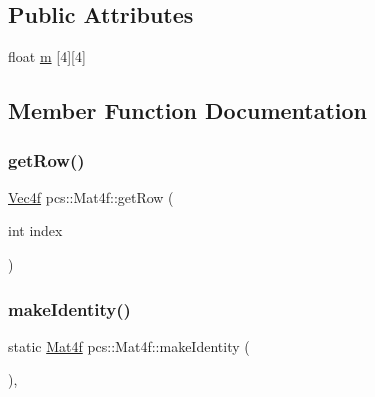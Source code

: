 \subsection*{Public Attributes}
\begin{DoxyCompactItemize}
\item 
float \hyperlink{structpcs_1_1Mat4f_ad5835795f842580da5e36a70c39cc6c9}{m} \mbox{[}4\mbox{]}\mbox{[}4\mbox{]}
\end{DoxyCompactItemize}


\subsection{Member Function Documentation}
\mbox{\label{structpcs_1_1Mat4f_a0703785e2c39f97f89c8305578f40ed8}} 
\subsubsection{\texorpdfstring{get\+Row()}{getRow()}}
{\footnotesize\ttfamily \hyperlink{namespacepcs_a826b4146f438aa3a4c6a5c157bc8dea2}{Vec4f} pcs\+::\+Mat4f\+::get\+Row (\begin{DoxyParamCaption}\item[{int}]{index }\end{DoxyParamCaption})\hspace{0.3cm}{\ttfamily [inline]}}

\mbox{\label{structpcs_1_1Mat4f_a3c7026479b0855ee1e1a4ff962872a95}} 
\subsubsection{\texorpdfstring{make\+Identity()}{makeIdentity()}}
{\footnotesize\ttfamily static \hyperlink{structpcs_1_1Mat4f}{Mat4f} pcs\+::\+Mat4f\+::make\+Identity (\begin{DoxyParamCaption}{ }\end{DoxyParamCaption})\hspace{0.3cm}{\ttfamily [inline]}, {\ttfamily [static]}}

\mbox{\label{structpcs_1_1Mat4f_a0bacf80f2ce6f50ad379299010a7cc44}} 
